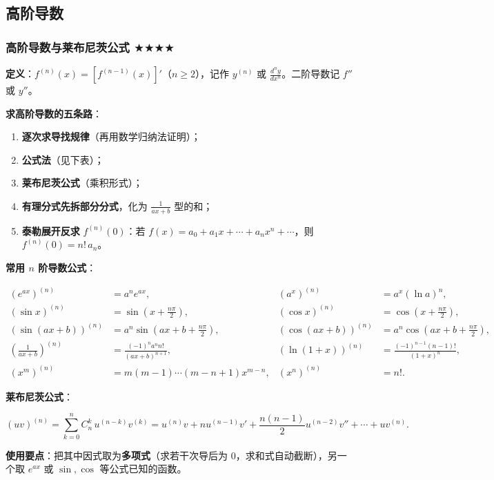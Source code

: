 \documentclass[11pt,openany,UTF8]{ctexbook}
\begin{document}
\subsection{高阶导数}

\subsubsection{高阶导数与莱布尼茨公式 $\bigstar$$\bigstar$$\bigstar$$\bigstar$}

\textbf{定义}：$f^{(n)}(x)=[f^{(n-1)}(x)]'$（$n\ge2$），记作 $y^{(n)}$ 或 $\frac{d^ny}{dx^n}$。二阶导数记 $f''$ 或 $y''$。

\textbf{求高阶导数的五条路}：

\begin{enumerate}
\item \textbf{逐次求导找规律}（再用数学归纳法证明）；
\item \textbf{公式法}（见下表）；
\item \textbf{莱布尼茨公式}（乘积形式）；
\item \textbf{有理分式先拆部分分式}，化为 $\frac{1}{ax+b}$ 型的和；
\item \textbf{泰勒展开反求} $f^{(n)}(0)$：若 $f(x)=a_0+a_1x+\cdots+a_nx^n+\cdots$，则 $f^{(n)}(0)=n!\,a_n$。
\end{enumerate}
\textbf{常用 $n$ 阶导数公式}：

\[\begin{aligned}
(e^{ax})^{(n)}&=a^ne^{ax}, & (a^x)^{(n)}&=a^x(\ln a)^n,\\
(\sin x)^{(n)}&=\sin\!\left(x+\frac{n\pi}{2}\right), & (\cos x)^{(n)}&=\cos\!\left(x+\frac{n\pi}{2}\right),\\
(\sin(ax+b))^{(n)}&=a^n\sin\!\left(ax+b+\frac{n\pi}{2}\right), & (\cos(ax+b))^{(n)}&=a^n\cos\!\left(ax+b+\frac{n\pi}{2}\right),\\
\left(\frac{1}{ax+b}\right)^{(n)}&=\frac{(-1)^na^nn!}{(ax+b)^{n+1}}, & (\ln(1+x))^{(n)}&=\frac{(-1)^{n-1}(n-1)!}{(1+x)^n},\\
(x^m)^{(n)}&=m(m-1)\cdots(m-n+1)x^{m-n}, & (x^n)^{(n)}&=n!.
\end{aligned}\]

\textbf{莱布尼茨公式}：

\[(uv)^{(n)}=\sum_{k=0}^{n}C_n^k\,u^{(n-k)}v^{(k)}
=u^{(n)}v+nu^{(n-1)}v'+\frac{n(n-1)}{2}u^{(n-2)}v''+\cdots+uv^{(n)}.\]

\textbf{使用要点}：把其中因式取为\textbf{多项式}（求若干次导后为 $0$，求和式自动截断），另一个取 $e^{ax}$ 或 $\sin,\cos$ 等公式已知的函数。
\end{document}
